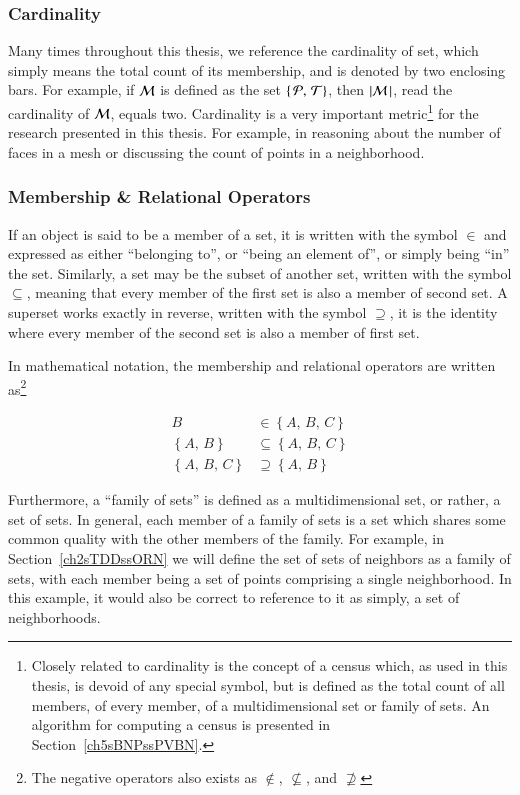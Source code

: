 %
%
\subsubsection{Cardinality}
\label{ch2sETBssSTsssC}
Many times throughout this thesis, we reference the cardinality of set, which simply means the total count of its membership, and is denoted by two enclosing bars. For example, if $\mathcal{M}$ is defined as the set $\left \{\,\mathcal{P},\,\mathcal{T}\right \}$, then $|\mathcal{M}\,| $, read the cardinality of $\mathcal{M}$, equals two. Cardinality is a very important metric\footnote{Closely related to cardinality is the concept of a census which, as used in this thesis, is devoid of any special symbol, but is defined as the total count of all members, of every member, of a multidimensional set or family of sets. An algorithm for computing a census is presented in Section~\ref{ch5sBNPssPVBN}.} for the research presented in this thesis. For example, in reasoning about the number of faces in a mesh or discussing the count of points in a neighborhood.

%
%
\subsubsection{Membership \& Relational Operators}
\label{ch2sETBssSTsssMRO}
If an object is said to be a member of a set, it is written with the symbol $\in$ and expressed as either ``belonging to'', or ``being an element of'', or simply being ``in'' the set. Similarly, a set may be the subset of another set, written with the symbol $\subseteq$, meaning that every member of the first set is also a member of second set. A superset works exactly in reverse, written with the symbol $\supseteq$, it is the identity where every member of the second set is also a member of first set.

In mathematical notation, the membership and relational operators are written as\footnote{The negative operators also exists as $\notin$, $\nsubseteq$, and  $\nsupseteq$}

\begin{align}
	B & \in \left \{A,\,B,\,C\right \} \\
	\left \{A,\,B\right \} & \subseteq \left \{A,\,B,\,C\right \} \\
	\left \{A,\,B,\,C\right \} & \supseteq \left \{A,\,B\right \}
\end{align}

Furthermore, a ``family of sets'' is defined as a multidimensional set, or rather, a set of sets. In general, each member of a family of sets is a set which shares some common quality with the other members of the family. For example, in Section~\ref{ch2sTDDssORN} we will define the set of sets of neighbors as a family of sets, with each member being a set of points comprising a single neighborhood. In this example, it would also be correct to reference to it as simply, a set of neighborhoods.


